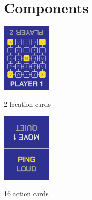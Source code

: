 \section*{Components}
\vspace{1ex}
\begin{center}
\begin{minipage}{0.45\linewidth}
\begin{center}
\includegraphics[height=3.5cm]{location_card.png}
\vspace{1.5ex}

2 location cards
\end{center}
\end{minipage}
\begin{minipage}{0.45\linewidth}
\begin{center}
\includegraphics[height=3.5cm]{action_card.png}
\vspace{1.5ex}

16 action cards
\end{center}
\end{minipage}
\end{center}

